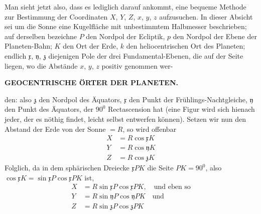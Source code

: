 Man sieht jetzt also, dass es lediglich darauf ankommt, eine bequeme Methode
zur Bestimmung der Coordinaten $X$, $Y$, $Z$, $x$, $y$, $z$ aufzusuchen. In dieser
Absicht sei um die Sonne eine Kugelfläche mit unbestimmtem Halbmesser
beschrieben; auf derselben bezeichne $P$ den Nordpol der Ecliptik, $p$ den Nordpol
der Ebene der Planeten-Bahn; $K$ den Ort der Erde, $k$ den heliocentrischen
Ort des Planeten; endlich $\mathfrak{x}$, $\mathfrak{y}$, $\mathfrak{z}$ diejenigen Pole der drei Fundamental-Ebenen,
die auf der Seite liegen, wo die Abstände $x$, $y$, $z$ positiv genommen wer-\par\clearpage
\endgroup
\begingroup
\pagestyle{empty}
\newcommand{\GaussVIGathering}[2]{%
  \fancypagestyle{gaussVIGathering}{%
    \fancyhf{}%
    \renewcommand{\headrulewidth}{0pt}%
    \renewcommand{\footrulewidth}{0pt}%
    \fancyfoot[C]{\makebox[\textwidth][l]{%
      \hspace*{.025\textwidth}{\footnotesize\bfseries #1}\hfill
      {\normalsize\bfseries\textls[90]{#2}}\hspace*{.18\textwidth}}}%
  }%
  \thispagestyle{gaussVIGathering}%
}
\setlength{\abovedisplayskip}{7pt plus 2pt minus 2pt}
\setlength{\belowdisplayskip}{7pt plus 2pt minus 2pt}
\setlength{\abovedisplayshortskip}{4pt plus 2pt}
\setlength{\belowdisplayshortskip}{5pt plus 2pt minus 1pt}
\setlength{\jot}{2pt}
\thispagestyle{empty}
\noindent{}%
\makebox[12mm][l]{}%
\parbox[t]{\dimexpr\linewidth-24mm\relax}{\centering\footnotesize\bfseries GEOCENTRISCHE ÖRTER DER PLANETEN.\par}%
\par\nobreak\medskip
\noindent den: also $\mathfrak{z}$ den Nordpol des Äquators, $\mathfrak{x}$ den Punkt der Frühlings-Nachtgleiche,
$\mathfrak{y}$ den Punkt des Äquators, der $90^0$ Rectascension hat (eine Figur wird
sich hienach jeder, der es nöthig findet, leicht selbst entwerfen können). Setzen
wir nun den Abstand der Erde von der Sonne $=R$, so wird offenbar
\[
\begin{aligned}
X&=R\cos\mathfrak{x}K\\
Y&=R\cos\mathfrak{y}K\\
Z&=R\cos\mathfrak{z}K
\end{aligned}
\]
Folglich, da in dem sphärischen Dreiecke $\mathfrak{x}PK$ die Seite $PK=90^0$, also
$\cos\mathfrak{x}K=\sin\mathfrak{x}P\cos\mathfrak{x}PK$ ist,
\[
\begin{aligned}
X&=R\sin\mathfrak{x}P\cos\mathfrak{x}PK,\quad\text{und eben so}\\
Y&=R\sin\mathfrak{y}P\cos\mathfrak{y}PK\quad\text{und}\\
Z&=R\sin\mathfrak{z}P\cos\mathfrak{z}PK
\end{aligned}
\]

